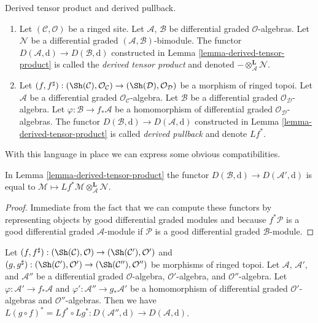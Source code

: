 \begin{definition}
\label{definition-pullback}
Derived tensor product and derived pullback.
\begin{enumerate}
\item Let $(\mathcal{C}, \mathcal{O})$ be a ringed site. Let
$\mathcal{A}$, $\mathcal{B}$ be differential graded $\mathcal{O}$-algebras.
Let $\mathcal{N}$ be a  differential graded
$(\mathcal{A}, \mathcal{B})$-bimodule.
The functor $D(\mathcal{A}, \text{d}) \to D(\mathcal{B}, \text{d})$
constructed in Lemma \ref{lemma-derived-tensor-product}
is called the {\it derived tensor product} and denoted
$- \otimes_\mathcal{A}^\mathbf{L} \mathcal{N}$.
\item Let $(f, f^\sharp) : (\Sh(\mathcal{C}), \mathcal{O}_\mathcal{C})
\to (\Sh(\mathcal{D}), \mathcal{O}_\mathcal{D})$
be a morphism of ringed topoi. Let $\mathcal{A}$ be a differential
graded $\mathcal{O}_\mathcal{C}$-algebra. Let $\mathcal{B}$ be a
differential graded $\mathcal{O}_\mathcal{D}$-algebra. Let
$\varphi : \mathcal{B} \to f_*\mathcal{A}$ be a homomorphism
of differential graded $\mathcal{O}_\mathcal{D}$-algebras.
The functor $D(\mathcal{B}, \text{d}) \to D(\mathcal{A}, \text{d})$
constructed in Lemma \ref{lemma-derived-tensor-product}
is called {\it derived pullback}
and denote $Lf^*$.
\end{enumerate}
\end{definition}

\noindent
With this language in place we can express some obvious compatibilities.

\begin{lemma}
\label{lemma-compose-pullback-tensor}
In Lemma \ref{lemma-derived-tensor-product} the functor
$D(\mathcal{B}, \text{d}) \to D(\mathcal{A}', \text{d})$ is equal to
$\mathcal{M} \mapsto
Lf^*\mathcal{M} \otimes_\mathcal{A}^\mathbf{L} \mathcal{N}$.
\end{lemma}

\begin{proof}
Immediate from the fact that we can compute these functors
by representing objects by good differential graded modules
and because $f^*\mathcal{P}$ is a good differential graded
$\mathcal{A}$-module if $\mathcal{P}$ is a good differential
graded $\mathcal{B}$-module.
\end{proof}

\begin{lemma}
\label{lemma-compose-pullback}
Let $(f, f^\sharp) : (\Sh(\mathcal{C}), \mathcal{O})
\to (\Sh(\mathcal{C}'), \mathcal{O}')$ and
$(g, g^\sharp) : (\Sh(\mathcal{C}'), \mathcal{O}')
\to (\Sh(\mathcal{C}''), \mathcal{O}'')$
be morphisms of ringed topoi. Let $\mathcal{A}$, $\mathcal{A}'$, and
$\mathcal{A}''$ be a differential graded $\mathcal{O}$-algebra,
$\mathcal{O}'$-algebra, and $\mathcal{O}''$-algebra. Let
$\varphi : \mathcal{A}' \to f_*\mathcal{A}$ and
$\varphi' : \mathcal{A}'' \to g_*\mathcal{A}'$
be a homomorphism of differential graded $\mathcal{O}'$-algebras
and $\mathcal{O}''$-algebras.
Then we have $L(g \circ f)^* = Lf^* \circ Lg^* :
D(\mathcal{A}'', \text{d}) \to D(\mathcal{A}, \text{d})$.
\end{lemma}

